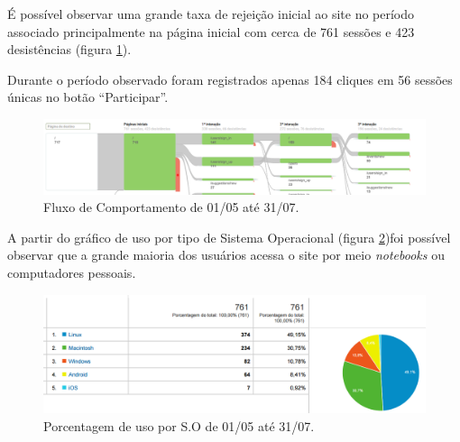 \par É possível observar uma grande taxa de rejeição inicial ao site no período associado principalmente na página inicial com cerca de 761 sessões e 423 desistências (figura \ref{fig:analytics_1ainteracao_fluxo}).
\par Durante o período observado foram registrados apenas 184 cliques em 56 sessões únicas no botão ``Participar''.
\begin{figure}[htb]
\centering
\includegraphics[width=15cm]{figuras/analytics_1ainteracao_fluxo}
\caption{\label{fig:analytics_1ainteracao_fluxo} Fluxo de Comportamento de 01/05 até 31/07.}
\end{figure}
\par A partir do gráfico de uso por tipo de Sistema Operacional (figura \ref{fig:analytics_1interacao_so})foi possível observar que a grande maioria dos usuários acessa o site por meio \emph{notebooks} ou computadores pessoais.
\begin{figure}[htb]
\includegraphics[width=15cm]{figuras/analytics_1interacao_so}
\caption{\label{fig:analytics_1interacao_so} Porcentagem de uso por S.O de 01/05 até 31/07.}
\end{figure}

